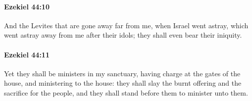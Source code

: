 		\paragraph{Ezekiel 44:10} %
			\label{EZEKIEL-44-10}

			And the Levites that are gone away far from me, when Israel went astray, which went astray away from me after their idols; they shall even bear their iniquity.


		\paragraph{Ezekiel 44:11} %
			\label{EZEKIEL-44-11}

			Yet they shall be ministers in my sanctuary, having charge at the gates of the house, and ministering to the house: they shall slay the burnt offering and the sacrifice for the people, and they shall stand before them to minister unto them.

